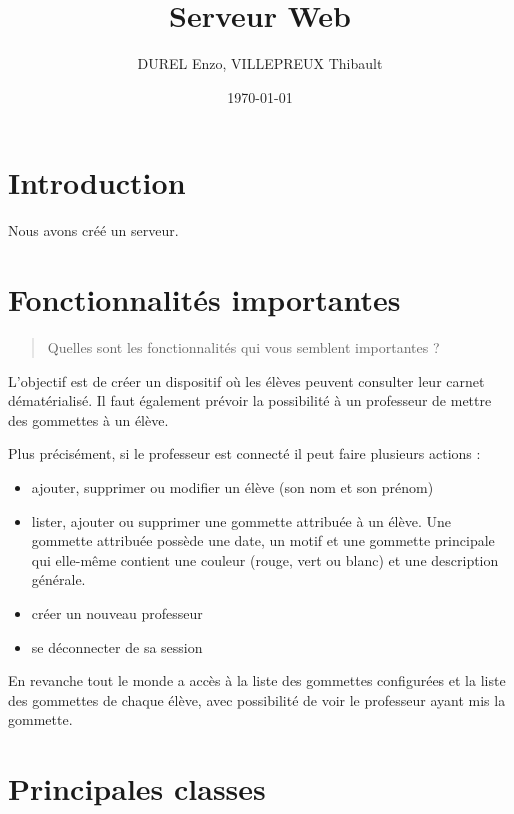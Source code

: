 \documentclass[11pt]{article}
\author{DUREL Enzo, VILLEPREUX Thibault}
\date{\today}
\title{Serveur Web}
\begin{document}
\maketitle
\tableofcontents

\thispagestyle{fancy}

\newpage

\section{Introduction}
\label{sec:org40456fe}

Nous avons créé un serveur.

\section{Fonctionnalités importantes}
\label{sec:orgc280ad7}

\begin{quote}
Quelles sont les fonctionnalités qui vous semblent importantes ?
\end{quote}

L'objectif est de créer un dispositif où les élèves peuvent consulter leur carnet dématérialisé. Il faut également prévoir la possibilité à un professeur de mettre des gommettes à un élève.

Plus précisément, si le professeur est connecté il peut faire plusieurs actions :
\begin{itemize}
\item ajouter, supprimer ou modifier un élève (son nom et son prénom)
\item lister, ajouter ou supprimer une gommette attribuée à un élève. Une gommette attribuée possède une date, un motif et une gommette principale qui elle-même contient une couleur (rouge, vert ou blanc) et une description générale.
\item créer un nouveau professeur
\item se déconnecter de sa session
\end{itemize}

En revanche tout le monde a accès à la liste des gommettes configurées et la liste des gommettes de chaque élève, avec possibilité de voir le professeur ayant mis la gommette.

\section{Principales classes}
\label{sec:org756013a}
\end{document}
